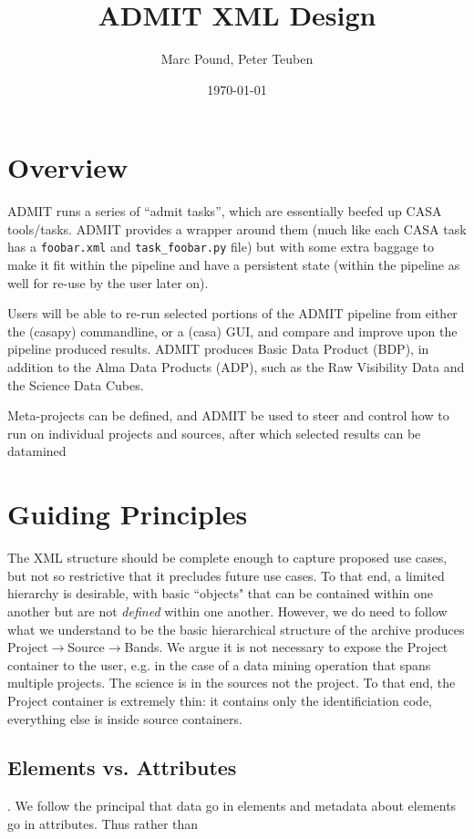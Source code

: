 \documentclass{report}
\title{ADMIT XML Design}
\author{Marc Pound, Peter Teuben}
\date{\today}
\begin{document}
\maketitle

\section{Overview}

ADMIT runs a series of ``admit tasks'', which are essentially beefed up
CASA tools/tasks. ADMIT provides a wrapper around them (much like
each CASA task has a {\tt foobar.xml} and {\tt task\_foobar.py} 
file) but with 
some extra baggage to make it fit within the pipeline and have a
persistent state (within the pipeline as well for re-use by the user
later on).

Users will be able to re-run selected portions of the ADMIT pipeline
from either the (casapy) commandline, or a (casa) GUI, and compare
and improve upon the pipeline produced results. ADMIT produces
Basic Data Product (BDP), in addition to the Alma Data Products
(ADP), such as the Raw Visibility Data and the Science Data Cubes.

Meta-projects can be defined, and ADMIT be used to steer and control
how to run on individual projects and sources, after which selected
results can be datamined 



\section{Guiding Principles}
The XML structure should be complete enough to capture proposed use cases,
but not so restrictive that it precludes future use cases. To that end, a
limited hierarchy is desirable, with basic ``objects" that can be contained
within one another but are not {\it defined} within one another.  However, we
do need to follow what we understand to be the basic hierarchical structure
of the archive produces Project$\rightarrow$Source$\rightarrow$Bands.
We argue it is not necessary to expose the Project container to
the user, e.g. in the case of a data mining operation that spans multiple
projects. The science is in the sources not the project. To that end, the
Project container is extremely thin: it contains only the identificiation
code, everything else is inside source containers.

\subsection{Elements vs. Attributes}.  
We follow the principal that data go in elements and metadata about
elements go in attributes.   Thus rather than
\end{document}
